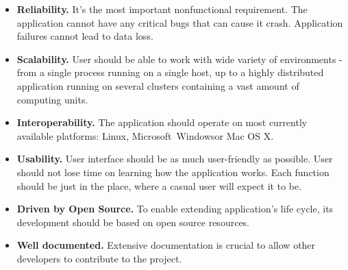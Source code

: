 \begin{itemize}

\item {\bf Reliability.}
It's the most important nonfunctional requirement. The application cannot have any critical bugs that can cause it crash. Application failures cannot lead to data loss. 

\item {\bf Scalability.}
User should be able to work with wide variety of environments - from a single process running on a single host, up to a highly distributed application running on several clusters containing a vast amount of computing units.

\item {\bf Interoperability.}
The application should operate on most currently available platforms: Linux, Microsoft\textregistered~Windows\textregistered or Mac OS X\textregistered.

\item {\bf Usability.}
User interface should be as much user-friendly as possible. User should not lose time on learning how the application works. Each function should be just in the place, where a casual user will expect it to be.

\item {\bf Driven by Open Source.}
To enable extending  application's life cycle, its development should be based on open source resources.

\item {\bf Well documented.}
Extensive documentation is crucial to allow other developers to contribute to the project.

\end{itemize}

